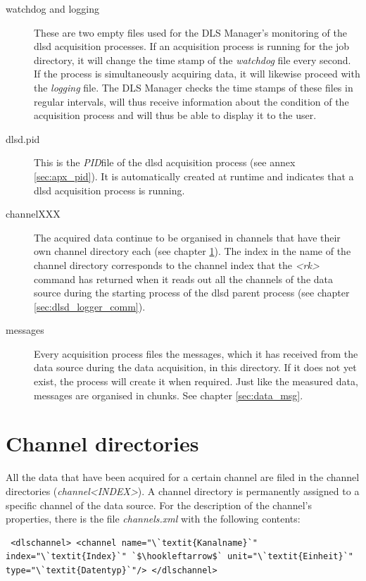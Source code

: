 \documentclass[a4paper,12pt,BCOR6mm,bibtotoc,idxtotoc]{scrbook}
\begin{document}
\begin{description}
\item[watchdog and logging] These are two empty files used for the DLS Manager’s monitoring of the dlsd acquisition processes. If an acquisition process is running for the job directory, it will change the time stamp of the \textit{watchdog} file every second. If the process is simultaneously acquiring data, it will likewise proceed with the \textit{logging} file. The DLS Manager checks the time stamps of these files in regular intervals, will thus receive information about the condition of the acquisition process and will thus be able to display it to the user. 
\item[dlsd.pid] This is the \textit{PID}file of the dlsd acquisition process (see annex \ref{sec:apx_pid}). It is automatically created at runtime and indicates that a dlsd acquisition process is running. 
\item[channelXXX] The acquired data continue to be organised in channels that have their own channel directory each (see chapter \ref{sec:data_channels}). The index in the name of the channel directory corresponds to the channel index that the \textit{\textless rk\textgreater}  command has returned when it reads out all the channels of the data source during the starting process of the dlsd parent process (see chapter \ref{sec:dlsd_logger_comm}). 
\item[messages] Every acquisition process files the messages, which it has received from the data source during the data acquisition, in this directory. If it does not yet exist, the process will create it when required. Just like the measured data, messages are organised in chunks. See chapter \ref{sec:data_msg}. \end{description}


\section{Channel directories} \label{sec:data_channels}

All the data that have been acquired for a certain channel are filed in the channel directories (\textit{channel\textless INDEX\textgreater}). A channel directory is permanently assigned to a specific channel of the data source. For the description of the channel’s properties, there is the file \textit{channels.xml} with the following contents:

\begin{lstlisting} <dlschannel> <channel name="\`textit{Kanalname}`" index="\`textit{Index}`" `$\hookleftarrow$` unit="\`textit{Einheit}`" type="\`textit{Datentyp}`"/> </dlschannel> \end{lstlisting}
\end{document}
